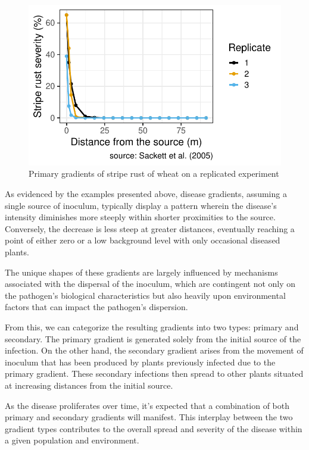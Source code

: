 \documentclass[
  letterpaper,
  DIV=11,
  numbers=noendperiod]{scrreprt}
\begin{document}
\begin{figure}[H]

{\centering \includegraphics{spatial-gradients_files/figure-pdf/fig-grad2-1.pdf}

}

\caption{\label{fig-grad2}Primary gradients of stripe rust of wheat on a
replicated experiment}

\end{figure}

As evidenced by the examples presented above, disease gradients,
assuming a single source of inoculum, typically display a pattern
wherein the disease's intensity diminishes more steeply within shorter
proximities to the source. Conversely, the decrease is less steep at
greater distances, eventually reaching a point of either zero or a low
background level with only occasional diseased plants.

The unique shapes of these gradients are largely influenced by
mechanisms associated with the dispersal of the inoculum, which are
contingent not only on the pathogen's biological characteristics but
also heavily upon environmental factors that can impact the pathogen's
dispersion.

From this, we can categorize the resulting gradients into two types:
primary and secondary. The primary gradient is generated solely from the
initial source of the infection. On the other hand, the secondary
gradient arises from the movement of inoculum that has been produced by
plants previously infected due to the primary gradient. These secondary
infections then spread to other plants situated at increasing distances
from the initial source.

As the disease proliferates over time, it's expected that a combination
of both primary and secondary gradients will manifest. This interplay
between the two gradient types contributes to the overall spread and
severity of the disease within a given population and environment.
\end{document}
